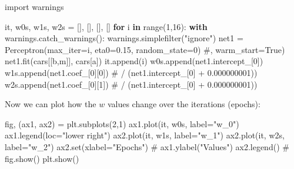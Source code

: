\documentclass[
  letterpaper,
]{scrbook}
\newenvironment{Shaded}{\begin{snugshade}}{\end{snugshade}}
\newcommand{\BuiltInTok}[1]{\textcolor[rgb]{0.00,0.23,0.31}{#1}}
\newcommand{\CommentTok}[1]{\textcolor[rgb]{0.37,0.37,0.37}{#1}}
\newcommand{\ControlFlowTok}[1]{\textcolor[rgb]{0.00,0.23,0.31}{\textbf{#1}}}
\newcommand{\DecValTok}[1]{\textcolor[rgb]{0.68,0.00,0.00}{#1}}
\newcommand{\FloatTok}[1]{\textcolor[rgb]{0.68,0.00,0.00}{#1}}
\newcommand{\ImportTok}[1]{\textcolor[rgb]{0.00,0.46,0.62}{#1}}
\newcommand{\KeywordTok}[1]{\textcolor[rgb]{0.00,0.23,0.31}{\textbf{#1}}}
\newcommand{\NormalTok}[1]{\textcolor[rgb]{0.00,0.23,0.31}{#1}}
\newcommand{\OperatorTok}[1]{\textcolor[rgb]{0.37,0.37,0.37}{#1}}
\newcommand{\StringTok}[1]{\textcolor[rgb]{0.13,0.47,0.30}{#1}}
\begin{document}
\begin{Shaded}
\begin{Highlighting}[]
\ImportTok{import}\NormalTok{ warnings}

\NormalTok{it, w0s, w1s, w2s }\OperatorTok{=}\NormalTok{ [], [], [], []}
\ControlFlowTok{for}\NormalTok{ i }\KeywordTok{in} \BuiltInTok{range}\NormalTok{(}\DecValTok{1}\NormalTok{,}\DecValTok{16}\NormalTok{):}
    \ControlFlowTok{with}\NormalTok{ warnings.catch\_warnings():}
\NormalTok{        warnings.simplefilter(}\StringTok{"ignore"}\NormalTok{)}
\NormalTok{        net1 }\OperatorTok{=}\NormalTok{ Perceptron(max\_iter}\OperatorTok{=}\NormalTok{i, eta0}\OperatorTok{=}\FloatTok{0.15}\NormalTok{, random\_state}\OperatorTok{=}\DecValTok{0}\NormalTok{) }\CommentTok{\#, warm\_start=True)}
\NormalTok{        net1.fit(cars[[}\StringTok{\textquotesingle{}b\textquotesingle{}}\NormalTok{,}\StringTok{\textquotesingle{}m\textquotesingle{}}\NormalTok{]], cars[}\StringTok{\textquotesingle{}a\textquotesingle{}}\NormalTok{])}
\NormalTok{    it.append(i)}
\NormalTok{    w0s.append(net1.intercept\_[}\DecValTok{0}\NormalTok{])}
\NormalTok{    w1s.append(net1.coef\_[}\DecValTok{0}\NormalTok{][}\DecValTok{0}\NormalTok{]) }\CommentTok{\# / (net1.intercept\_[0] + 0.000000001))}
\NormalTok{    w2s.append(net1.coef\_[}\DecValTok{0}\NormalTok{][}\DecValTok{1}\NormalTok{]) }\CommentTok{\# / (net1.intercept\_[0] + 0.000000001))}
\end{Highlighting}
\end{Shaded}

Now we can plot how the \(w\) values change over the iterations
(epochs):

\begin{Shaded}
\begin{Highlighting}[]
\NormalTok{fig, (ax1, ax2) }\OperatorTok{=}\NormalTok{ plt.subplots(}\DecValTok{2}\NormalTok{,}\DecValTok{1}\NormalTok{)}
\NormalTok{ax1.plot(it, w0s, label}\OperatorTok{=}\StringTok{"w\_0"}\NormalTok{)}
\NormalTok{ax1.legend(loc}\OperatorTok{=}\StringTok{"lower right"}\NormalTok{)}
\NormalTok{ax2.plot(it, w1s, label}\OperatorTok{=}\StringTok{"w\_1"}\NormalTok{)}
\NormalTok{ax2.plot(it, w2s, label}\OperatorTok{=}\StringTok{"w\_2"}\NormalTok{)}
\NormalTok{ax2.}\BuiltInTok{set}\NormalTok{(xlabel}\OperatorTok{=}\StringTok{"Epochs"}\NormalTok{)}
\CommentTok{\# ax1.ylabel("Values")}
\NormalTok{ax2.legend()}
\CommentTok{\# fig.show()}
\NormalTok{plt.show()}
\end{Highlighting}
\end{Shaded}
\end{document}
